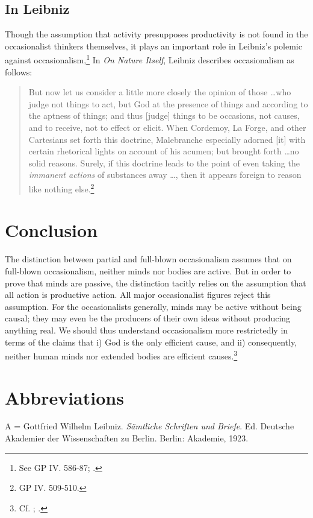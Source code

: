 \subsection{In Leibniz}
Though the assumption that activity presupposes productivity is not found in the occasionalist thinkers themselves, it plays an important role in Leibniz's polemic against occasionalism,\footnote{See GP IV. 586-87; \autocite{Rutherford1993}.} In \emph{On Nature Itself}, Leibniz describes occasionalism as follows:

\begin{quote}
	But now let us consider a little more closely the opinion of those \ldots who judge not things to act, but God at the presence of things and according to the aptness of things; and thus [judge] things to be occasions, not causes, and to receive, not to effect or elicit. When Cordemoy, La Forge, and other Cartesians set forth this doctrine, Malebranche especially adorned [it] with certain rhetorical lights on account of his acumen; but brought forth \ldots no solid reasons. Surely, if this doctrine leads to the point of even taking the \emph{immanent actions} of substances away \ldots, then it appears foreign to reason like nothing else.\footnote{GP IV. 509-510.}
\end{quote}

\section{Conclusion}
The distinction between partial and full-blown occasionalism assumes that on full-blown occasionalism, neither minds nor bodies are active. But in order to prove that minds are passive, the distinction tacitly relies on the assumption that all action is productive action. All major occasionalist figures reject this assumption. For the occasionalists generally, minds may be active without being causal; they may even be the producers of their own ideas without producing anything real. We should thus understand occasionalism more restrictedly in terms of the claims that i) God is the only efficient cause, and ii) consequently, neither human minds nor extended bodies are efficient causes.\footnote{Cf. \autocite[625-626]{Platt2011}; \autocite[101]{Gouhier1926}.}
\section{Abbreviations}

A = Gottfried Wilhelm Leibniz. \emph{Sämtliche Schriften und Briefe}.
Ed. Deutsche Akademier der Wissenschaften zu Berlin. Berlin: Akademie,
1923.

